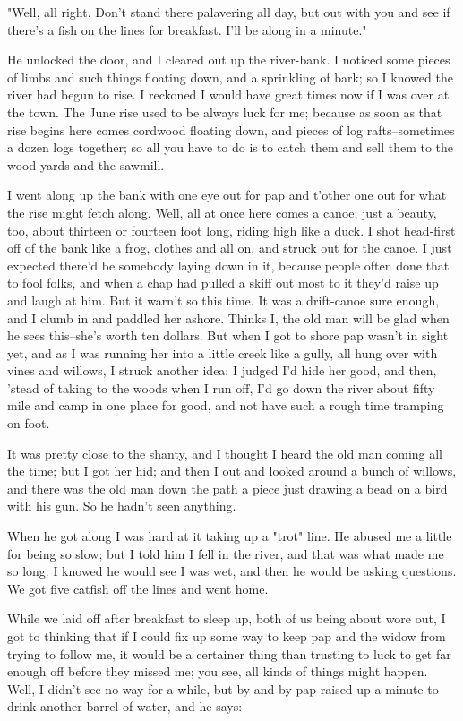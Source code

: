 "Well, all right.  Don't stand there palavering all day, but out with you
and see if there's a fish on the lines for breakfast.  I'll be along in a
minute."

He unlocked the door, and I cleared out up the river-bank.  I noticed
some pieces of limbs and such things floating down, and a sprinkling of
bark; so I knowed the river had begun to rise.  I reckoned I would have
great times now if I was over at the town.  The June rise used to be
always luck for me; because as soon as that rise begins here comes
cordwood floating down, and pieces of log rafts--sometimes a dozen logs
together; so all you have to do is to catch them and sell them to the
wood-yards and the sawmill.

I went along up the bank with one eye out for pap and t'other one out for
what the rise might fetch along.  Well, all at once here comes a canoe;
just a beauty, too, about thirteen or fourteen foot long, riding high
like a duck.  I shot head-first off of the bank like a frog, clothes and
all on, and struck out for the canoe.  I just expected there'd be
somebody laying down in it, because people often done that to fool folks,
and when a chap had pulled a skiff out most to it they'd raise up and
laugh at him.  But it warn't so this time.  It was a drift-canoe sure
enough, and I clumb in and paddled her ashore.  Thinks I, the old man
will be glad when he sees this--she's worth ten dollars.  But when I
got to shore pap wasn't in sight yet, and as I was running her into a
little creek like a gully, all hung over with vines and willows, I struck
another idea:  I judged I'd hide her good, and then, 'stead of taking to
the woods when I run off, I'd go down the river about fifty mile and camp
in one place for good, and not have such a rough time tramping on foot.

It was pretty close to the shanty, and I thought I heard the old man
coming all the time; but I got her hid; and then I out and looked around
a bunch of willows, and there was the old man down the path a piece just
drawing a bead on a bird with his gun.  So he hadn't seen anything.

When he got along I was hard at it taking up a "trot" line.  He abused me
a little for being so slow; but I told him I fell in the river, and that
was what made me so long.  I knowed he would see I was wet, and then he
would be asking questions.  We got five catfish off the lines and went
home.

While we laid off after breakfast to sleep up, both of us being about
wore out, I got to thinking that if I could fix up some way to keep pap
and the widow from trying to follow me, it would be a certainer thing
than trusting to luck to get far enough off before they missed me; you
see, all kinds of things might happen.  Well, I didn't see no way for a
while, but by and by pap raised up a minute to drink another barrel of
water, and he says:

